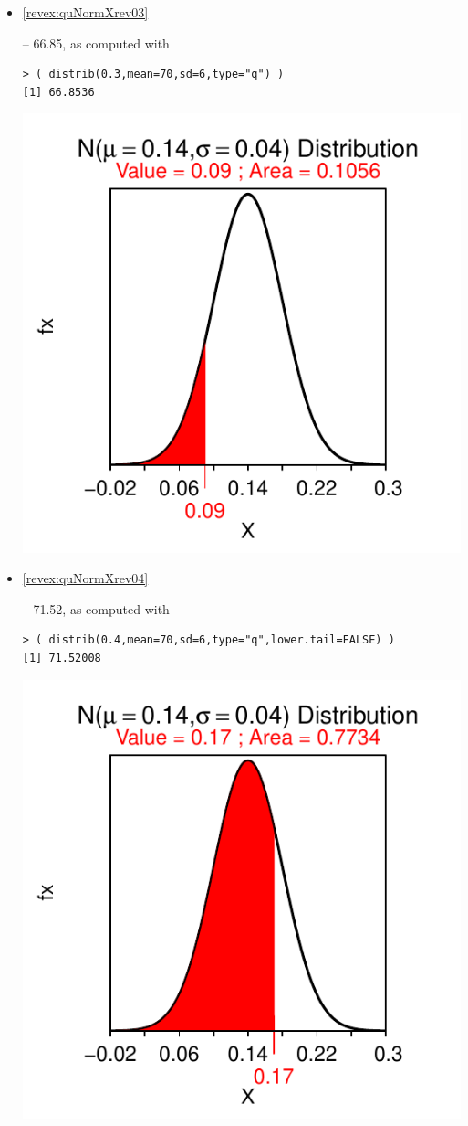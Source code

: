 \documentclass[10pt,openany]{book}\usepackage[]{graphicx}\usepackage[]{color}
\makeatletter
\newenvironment{kframe}{%
 \def\at@end@of@kframe{}%
 \ifinner\ifhmode%
  \def\at@end@of@kframe{\end{minipage}}%
  \begin{minipage}{\columnwidth}%
 \fi\fi%
 \def\FrameCommand##1{\hskip\@totalleftmargin \hskip-\fboxsep
 \colorbox{shadecolor}{##1}\hskip-\fboxsep
     \hskip-\linewidth \hskip-\@totalleftmargin \hskip\columnwidth}%
 \MakeFramed {\advance\hsize-\width
   \@totalleftmargin\z@ \linewidth\hsize
   \@setminipage}}%
 {\par\unskip\endMakeFramed%
 \at@end@of@kframe}
\newenvironment{knitrout}{}{} %
\makeatother
\begin{document}
\begin{itemize}
\begin{knitrout}
{}



\end{knitrout}

  \item \hypertarget{ans:quNormXrev03}{\ref{revex:quNormXrev03}} -- 66.85, as computed with
\begin{knitrout}
\color{fgcolor}\begin{kframe}
\begin{verbatim}
> ( distrib(0.3,mean=70,sd=6,type="q") )
[1] 66.8536
\end{verbatim}
\end{kframe}

{\centering \includegraphics[width=.4\linewidth]{Figs/unnamed-chunk-229-1} 

}



\end{knitrout}
  \item \hypertarget{ans:quNormXrev04}{\ref{revex:quNormXrev04}} -- 71.52, as computed with
\begin{knitrout}
\color{fgcolor}\begin{kframe}
\begin{verbatim}
> ( distrib(0.4,mean=70,sd=6,type="q",lower.tail=FALSE) )
[1] 71.52008
\end{verbatim}
\end{kframe}

{\centering \includegraphics[width=.4\linewidth]{Figs/unnamed-chunk-230-1} 

}
\end{knitrout}
\end{itemize}
\end{document}
